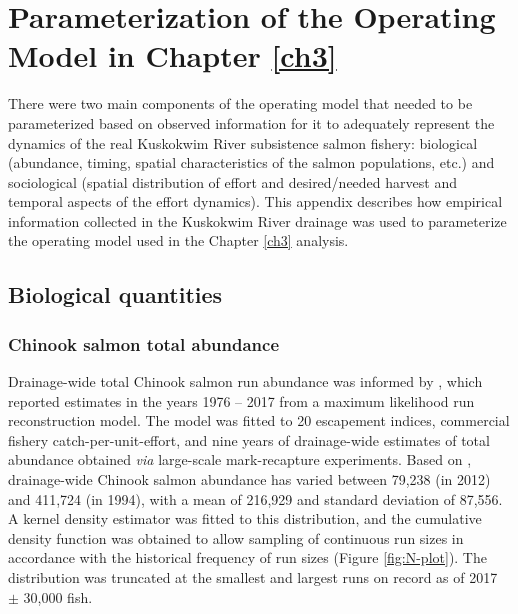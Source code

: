 \documentclass[12pt,]{book}
\theoremstyle{definition}
\theoremstyle{definition}
\theoremstyle{definition}
\theoremstyle{remark}
\begin{document}
\setlength{\parskip}{6pt plus 2pt minus 1pt}

\appendix


\captionsetup[figure]{list=yes} \captionsetup[table]{list=yes}

\chapter{Parameterization of the Operating Model in Chapter
\ref{ch3}}\label{appendix-a}

\noindent
There were two main components of the operating model that needed to be
parameterized based on observed information for it to adequately
represent the dynamics of the real Kuskokwim River subsistence salmon
fishery: biological (abundance, timing, spatial characteristics of the
salmon populations, etc.) and sociological (spatial distribution of
effort and desired/needed harvest and temporal aspects of the effort
dynamics). This appendix describes how empirical information collected
in the Kuskokwim River drainage was used to parameterize the operating
model used in the Chapter \ref{ch3} analysis.

\section{Biological quantities}\label{biological-quantities}

\subsection{Chinook salmon total abundance}\label{mse-data-N}

\noindent
Drainage-wide total Chinook salmon run abundance was informed by
\citet{liller-etal-2018}, which reported estimates in the years 1976 --
2017 from a maximum likelihood run reconstruction model. The model was
fitted to 20 escapement indices, commercial fishery
catch-per-unit-effort, and nine years of drainage-wide estimates of
total abundance obtained \emph{via} large-scale mark-recapture
experiments. Based on \citet{liller-etal-2018}, drainage-wide Chinook
salmon abundance has varied between 79,238 (in 2012) and 411,724 (in
1994), with a mean of 216,929 and standard deviation of 87,556. A kernel
density estimator was fitted to this distribution, and the cumulative
density function was obtained to allow sampling of continuous run sizes
in accordance with the historical frequency of run sizes (Figure
\ref{fig:N-plot}). The distribution was truncated at the smallest and
largest runs on record as of 2017 \(\pm\) 30,000 fish.
\end{document}
